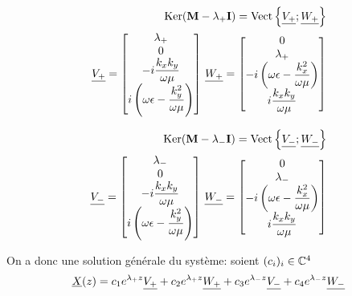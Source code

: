     \begin{align}
    \operatorname{Ker}(\mathbf{M}-\lambda_+\mathbf{I})=\operatorname{Vect}\left\lbrace\underline{V_+};\underline{W_+}\right\rbrace \\
        \underline{V_+} = 
        \begin{bmatrix}
        \lambda_+ \\
            0 \\
            -i\dfrac{k_xk_y}{\omega\mu} \\
            i\left(\omega\epsilon - \dfrac{k_y^2}{\omega\mu}\right) \\
        \end{bmatrix}
        \,
        \underline{W_+} = 
            \begin{bmatrix}
            0 \\
            \lambda_+ \\
            -i\left(\omega\epsilon - \dfrac{k_x^2}{\omega\mu}\right) \\
            i\dfrac{k_xk_y}{\omega\mu} \\
        \end{bmatrix}
    \end{align}

    \begin{align}
    \operatorname{Ker}(\mathbf{M}-\lambda_-\mathbf{I})=\operatorname{Vect}\left\lbrace\underline{V_-};\underline{W_-}\right\rbrace\\
        \underline{V_-} = 
        \begin{bmatrix}
            \lambda_- \\
            0 \\
            -i\dfrac{k_xk_y}{\omega\mu} \\
            i\left(\omega\epsilon - \dfrac{k_y^2}{\omega\mu}\right) \\
        \end{bmatrix}
        \,
        \underline{W_-} = 
        \begin{bmatrix}
            0 \\
            \lambda_- \\
            -i\left(\omega\epsilon - \dfrac{k_x^2}{\omega\mu}\right) \\
            i\dfrac{k_xk_y}{\omega\mu} \\
        \end{bmatrix}
    \end{align}

    On a donc une solution générale du système: soient $(c_i)_{i} \in \mathbb C^4$
    \begin{equation}
        \underline{X}(z) = c_1e^{\lambda_+ z}\underline{V_+}  + c_2e^{\lambda_+ z}\underline{W_+} + c_3e^{\lambda_- z}\underline{V_-} +c_4e^{\lambda_- z}\underline{W_-}
    \end{equation}

